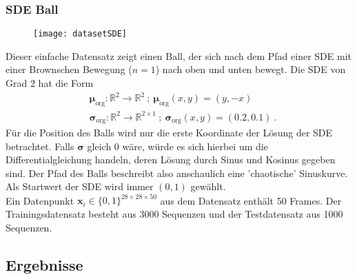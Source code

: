 \documentclass[12pt]{article}
\newcommand{\R}{\mathbb{R}}
\newcommand{\bmu}{\bm{\mu}}
\newcommand{\bsig}{\bm{\sigma}}
\newcommand{\x}{\mathbf{x}_i}
\begin{document}
	\subsubsection{SDE Ball}
		\vspace{-0.4cm}
	\begin{figure}[!htbp]
		\centering
		\texttt{[image: datasetSDE]}
	\end{figure}
	\vspace{-0.3cm}
	Dieser einfache Datensatz zeigt einen Ball, der sich nach dem Pfad einer SDE mit einer Brownschen Bewegung ($n=1$) nach oben und unten bewegt. Die SDE von Grad $2$ hat die Form
	\begin{align*}
	& \bmu_{\text{org}}: \R^{2} \rightarrow \R^{2} \ ; \ \bmu_{\text{org}}(x,y) = (y,-x)\\
	& \bsig_{\text{org}} : \R^{2} \rightarrow \R^{2 \times 1} \ ; \ \bsig_{\text{org}}(x,y) = (0.2, 0.1) \ .
	\end{align*}
	Für die Position des Balls wird nur die erste Koordinate der Lösung der SDE betrachtet. Falls $\bsig$ gleich $0$ wäre, würde es sich hierbei um die Differentialgleichung handeln, deren Lösung durch Sinus und Kosinus gegeben sind. Der Pfad des Balls beschreibt also anschaulich eine 'chaotische' Sinuskurve. Als Startwert der SDE wird immer $(0,1)$ gewählt.\\
	Ein Datenpunkt $\x\in \{0,1\}^{28\times 28\times 50}$ aus dem Datensatz enthält 50 Frames.
	Der Trainingsdatensatz besteht aus 3000 Sequenzen und der Testdatensatz aus 1000 Sequenzen.

	\subsection[Ergebnisse]{Ergebnisse}
\end{document}
